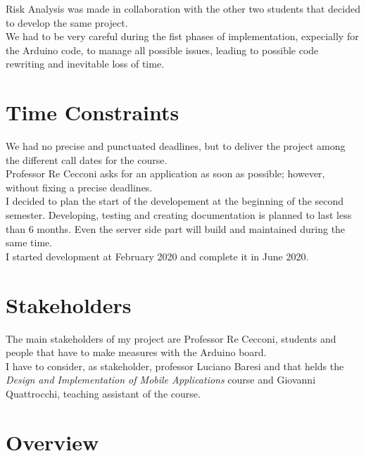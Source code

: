 Risk Analysis was made in collaboration with the other two students that decided to develop the same project.\\

We had to be very careful during the fist phases of implementation, expecially for the Arduino code, to manage all possible issues, leading to possible code rewriting and inevitable loss of time.

\section{Time Constraints}
We had no precise and punctuated deadlines, but to deliver the project among the different call dates for the course.\\

Professor Re Cecconi asks for an application as soon as possible; however, without fixing a precise deadlines.\\

I decided to plan the start of the developement at the beginning of the second semester. Developing, testing and creating documentation is planned to last less than 6 months. Even the server side part will build and maintained during the same time.\\

I started development at February 2020 and complete it in June 2020.

\section{Stakeholders}
The main stakeholders of my project are Professor Re Cecconi, students and people that have to make measures with the Arduino board.\\

I have to consider, as stakeholder, professor Luciano Baresi and that helds the \textit{Design and Implementation of Mobile Applications} course and Giovanni Quattrocchi, teaching assistant of the course.

\section{Overview}